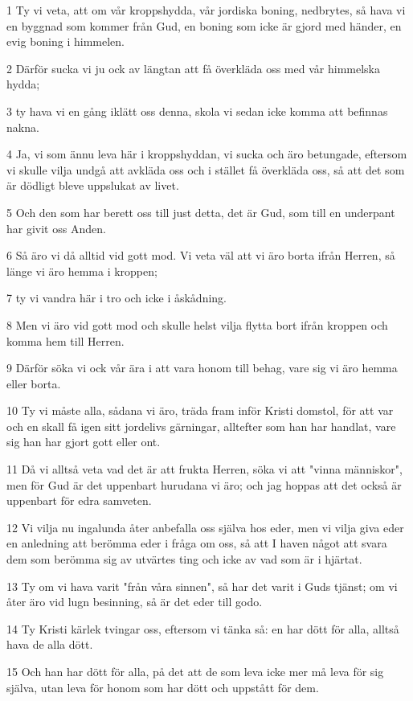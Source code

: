 \par 1 Ty vi veta, att om vår kroppshydda, vår jordiska boning, nedbrytes, så hava vi en byggnad som kommer från Gud, en boning som icke är gjord med händer, en evig boning i himmelen.
\par 2 Därför sucka vi ju ock av längtan att få överkläda oss med vår himmelska hydda;
\par 3 ty hava vi en gång iklätt oss denna, skola vi sedan icke komma att befinnas nakna.
\par 4 Ja, vi som ännu leva här i kroppshyddan, vi sucka och äro betungade, eftersom vi skulle vilja undgå att avkläda oss och i stället få överkläda oss, så att det som är dödligt bleve uppslukat av livet.
\par 5 Och den som har berett oss till just detta, det är Gud, som till en underpant har givit oss Anden.
\par 6 Så äro vi då alltid vid gott mod. Vi veta väl att vi äro borta ifrån Herren, så länge vi äro hemma i kroppen;
\par 7 ty vi vandra här i tro och icke i åskådning.
\par 8 Men vi äro vid gott mod och skulle helst vilja flytta bort ifrån kroppen och komma hem till Herren.
\par 9 Därför söka vi ock vår ära i att vara honom till behag, vare sig vi äro hemma eller borta.
\par 10 Ty vi måste alla, sådana vi äro, träda fram inför Kristi domstol, för att var och en skall få igen sitt jordelivs gärningar, alltefter som han har handlat, vare sig han har gjort gott eller ont.
\par 11 Då vi alltså veta vad det är att frukta Herren, söka vi att "vinna människor", men för Gud är det uppenbart hurudana vi äro; och jag hoppas att det också är uppenbart för edra samveten.
\par 12 Vi vilja nu ingalunda åter anbefalla oss själva hos eder, men vi vilja giva eder en anledning att berömma eder i fråga om oss, så att I haven något att svara dem som berömma sig av utvärtes ting och icke av vad som är i hjärtat.
\par 13 Ty om vi hava varit "från våra sinnen", så har det varit i Guds tjänst; om vi åter äro vid lugn besinning, så är det eder till godo.
\par 14 Ty Kristi kärlek tvingar oss, eftersom vi tänka så: en har dött för alla, alltså hava de alla dött.
\par 15 Och han har dött för alla, på det att de som leva icke mer må leva för sig själva, utan leva för honom som har dött och uppstått för dem.
